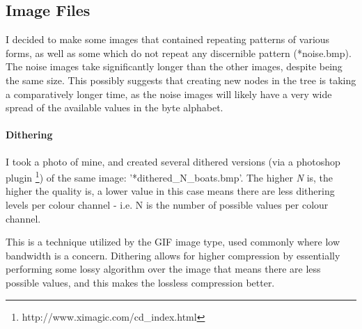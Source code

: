 \documentclass[]{article}
\begin{document}
\subsection{Image Files} I decided to make some images that contained repeating patterns of various forms, as well as some which do not repeat any discernible pattern (*noise.bmp). The noise images take significantly longer than the other images, despite being the same size. This possibly suggests that creating new nodes in the tree is taking a comparatively longer time, as the noise images will likely have a very wide spread of the available values in the byte alphabet.
\paragraph{Dithering} I took a photo of mine, and created several dithered versions (via a photoshop plugin \footnote[1]{http://www.ximagic.com/cd\_index.html}) of the same image: '*dithered\_N\_boats.bmp'. The higher \emph{N} is, the higher the quality is, a lower value in this case means there are less dithering levels per colour channel - i.e. N is the number of possible values per colour channel.

This is a technique utilized by the GIF image type, used commonly where low bandwidth is a concern. Dithering allows for higher compression by essentially performing some lossy algorithm over the image that means there are less possible values, and this makes the lossless compression better.
\end{document}
